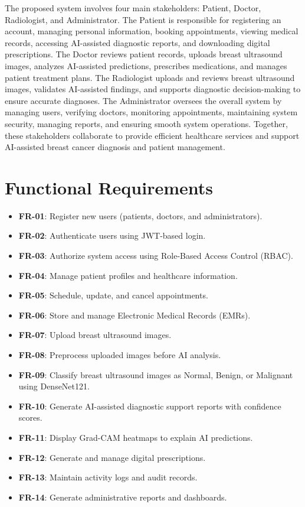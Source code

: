 \documentclass[12pt,a4paper]{report}
\begin{document}
The proposed system involves four main stakeholders: Patient, Doctor, Radiologist, and Administrator. The Patient is responsible for registering an account, managing personal information, booking appointments, viewing medical records, accessing AI-assisted diagnostic reports, and downloading digital prescriptions. The Doctor reviews patient records, uploads breast ultrasound images, analyzes AI-assisted predictions, prescribes medications, and manages patient treatment plans. The Radiologist uploads and reviews breast ultrasound images, validates AI-assisted findings, and supports diagnostic decision-making to ensure accurate diagnoses. The Administrator oversees the overall system by managing users, verifying doctors, monitoring appointments, maintaining system security, managing reports, and ensuring smooth system operations. Together, these stakeholders collaborate to provide efficient healthcare services and support AI-assisted breast cancer diagnosis and patient management.

\section{Functional Requirements}

\begin{itemize}[noitemsep]
    \item \textbf{FR-01}: Register new users (patients, doctors, and administrators).
    \item \textbf{FR-02}: Authenticate users using JWT-based login.
    \item \textbf{FR-03}: Authorize system access using Role-Based Access Control (RBAC).
    \item \textbf{FR-04}: Manage patient profiles and healthcare information.
    \item \textbf{FR-05}: Schedule, update, and cancel appointments.
    \item \textbf{FR-06}: Store and manage Electronic Medical Records (EMRs).
    \item \textbf{FR-07}: Upload breast ultrasound images.
    \item \textbf{FR-08}: Preprocess uploaded images before AI analysis.
    \item \textbf{FR-09}: Classify breast ultrasound images as Normal, Benign, or Malignant using DenseNet121.
    \item \textbf{FR-10}: Generate AI-assisted diagnostic support reports with confidence scores.
    \item \textbf{FR-11}: Display Grad-CAM heatmaps to explain AI predictions.
    \item \textbf{FR-12}: Generate and manage digital prescriptions.
    \item \textbf{FR-13}: Maintain activity logs and audit records.
    \item \textbf{FR-14}: Generate administrative reports and dashboards.
\end{itemize}
\end{document}
